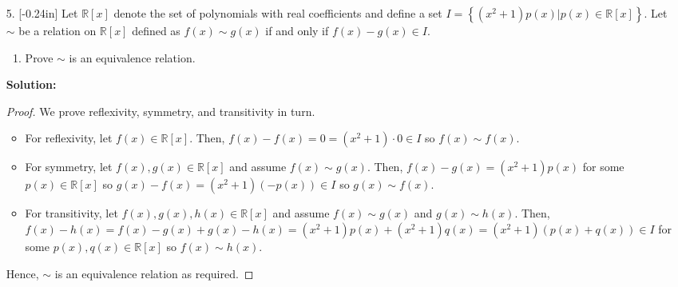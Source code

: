\documentclass[letterpaper,12pt]{article}
\newcommand{\set}[1]{\left\{ #1 \right\}}
\theoremstyle{definition}
\begin{document}
\begin{enumerate}
    \item[5.]  \reversemarginpar{}[-0.24in] Let $\mathbb{R}[x]$ denote the set of polynomials with real coefficients and define a set $I = \set{(x^2+1)p(x) | p(x) \in \mathbb{R}[x]}$. Let $\sim$ be a relation on $\mathbb{R}[x]$ defined as $f(x) \sim g(x)$ if and only if $f(x)-g(x) \in I$.
    \begin{enumerate}
        \item Prove $\sim$ is an equivalence relation.
        \end{enumerate}
        \begin{mdframed}
            \textbf{Solution:}
            \begin{proof}
                We prove reflexivity, symmetry, and transitivity in turn. \begin{itemize}
                    \item For reflexivity, let $f(x) \in \mathbb{R}[x]$. Then, $f(x) - f(x) = 0 = (x^2+1)\cdot 0 \in I$ so $f(x) \sim f(x)$.
                    \item For symmetry, let $f(x),g(x) \in \mathbb{R}[x]$ and assume $f(x) \sim g(x)$. Then, $f(x) - g(x) = (x^2+1)p(x)$ for some $p(x) \in \mathbb{R}[x]$ so $g(x) - f(x) = (x^2+1)(-p(x)) \in I$ so $g(x) \sim f(x)$.
                    \item For transitivity, let $f(x),g(x),h(x) \in \mathbb{R}[x]$ and assume $f(x) \sim g(x)$ and $g(x) \sim h(x)$. Then, $f(x) - h(x) = f(x)-g(x) + g(x) - h(x) = (x^2+1)p(x) + (x^2+1)q(x) = (x^2+1)(p(x)+q(x)) \in I$ for some $p(x),q(x) \in \mathbb{R}[x]$ so $f(x) \sim h(x)$.
                \end{itemize}
                Hence, $\sim$ is an equivalence relation as required.
            \end{proof}
        \end{mdframed}
\end{enumerate}
\pagebreak
\end{document}
